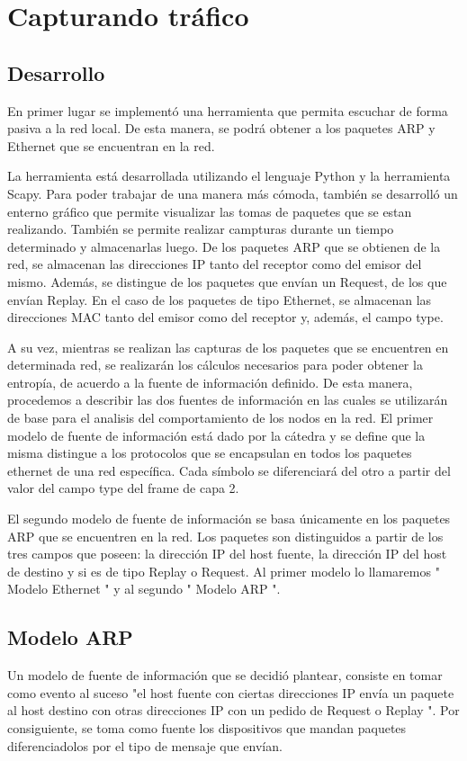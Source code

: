 \section{Capturando tráfico}

\subsection{Desarrollo}

En primer lugar se implementó una herramienta que permita escuchar de forma pasiva a la red local. De esta manera, se podrá obtener a los paquetes ARP y Ethernet que se encuentran en la red. 

La herramienta está desarrollada utilizando el lenguaje Python y la herramienta Scapy. Para poder trabajar de una manera más cómoda, también se desarrolló un enterno gráfico que permite visualizar las tomas de paquetes que se estan realizando. También se permite realizar campturas durante un tiempo determinado y almacenarlas luego.  
De los paquetes ARP que se obtienen de la red, se almacenan las direcciones IP tanto del receptor como del emisor del mismo. Además, se distingue de los paquetes que envían un Request, de los que envían Replay. En el caso de los paquetes de tipo Ethernet, se almacenan las direcciones MAC tanto del emisor como del receptor y, además, el campo type.

A su vez, mientras se realizan las capturas de los paquetes que se encuentren en determinada red, se realizarán los cálculos necesarios para poder obtener la entropía, de acuerdo a la fuente de información definido. De esta manera, procedemos a describir las dos fuentes de información en las cuales se utilizarán de base para el analisis del comportamiento de los nodos en la red. 
El primer modelo de fuente de información está dado por la cátedra y se define que la misma distingue a los protocolos que se encapsulan en todos los paquetes ethernet de una red específica. Cada símbolo se diferenciará del otro a partir del valor del campo type del frame de capa 2.

El segundo modelo de fuente de información se basa únicamente en los paquetes ARP que se encuentren en la red. Los paquetes son distinguidos a partir de los tres campos que poseen: la dirección IP del host fuente, la dirección IP del host de destino y si es de tipo Replay o Request. 
Al primer modelo lo llamaremos " Modelo Ethernet " y al segundo " Modelo ARP ".


\subsection{Modelo ARP}
Un modelo de fuente de información que se decidió plantear, consiste en tomar como evento al suceso "el host fuente con ciertas direcciones IP envía un paquete al host destino con otras direcciones IP con un pedido de Request o Replay ". Por consiguiente, se toma como fuente los dispositivos que mandan paquetes diferenciadolos por el tipo de mensaje que envían.


